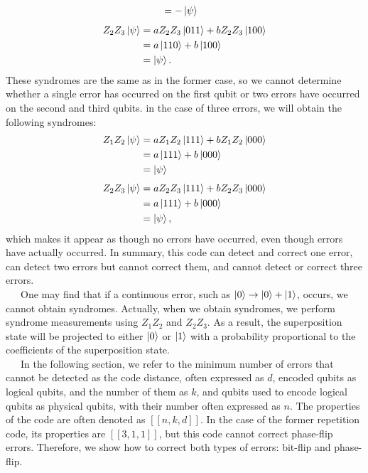 \documentclass[a4paper,11pt]{ltjsarticle}
\begin{document}
{{{\begin{align*}
                &= -\ket{\psi}
            \end{align*}
            \begin{align*}
                Z_2 Z_3\ket{\psi} &= aZ_2Z_3\ket{011}+bZ_2Z_3\ket{100}\\
                &= a\ket{110}+b\ket{100}\\
                &= \ket{\psi}.
            \end{align*}
            These syndromes are the same as in the former case, so we cannot determine whether a single error has occurred on the first qubit or two errors have occurred on the second and third qubits. in the case of three errors, we will obtain the following syndromes:
            \begin{align*}
                Z_1Z_2\ket{\psi} &= aZ_1Z_2\ket{111}+bZ_1Z_2\ket{000}\\
                &= a\ket{111}+b\ket{000}\\
                &= \ket{\psi}
            \end{align*}
            \begin{align*}
                Z_2 Z_3\ket{\psi} &= aZ_2Z_3\ket{111}+bZ_2Z_3\ket{000}\\
                &= a\ket{111}+b\ket{000}\\
                &= \ket{\psi},
            \end{align*}
            which makes it appear as though no errors have occurred, even though errors have actually occurred. In summary, this code can detect and correct one error, can detect two errors but cannot correct them, and cannot detect or correct three errors.\\
            \ \ \ One may find that if a continuous error, such as $\ket{0} \rightarrow \ket{0} + \ket{1}$, occurs, we cannot obtain syndromes. Actually, when we obtain syndromes, we perform syndrome measurements using $Z_1 Z_2$ and $Z_2 Z_3$. As a result, the superposition state will be projected to either $\ket{0}$ or $\ket{1}$ with a probability proportional to the coefficients of the superposition state.\\
            \ \ \ In the following section, we refer to the minimum number of errors that cannot be detected as the code distance, often expressed as $d$, encoded qubits as logical qubits, and the number of them as $k$, and qubits used to encode logical qubits as physical qubits, with their number often expressed as $n$. The properties of the code are often denoted as $[[n, k, d]]$. In the case of the former repetition code, its properties are $[[3, 1, 1]]$, but this code cannot correct phase-flip errors. Therefore, we show how to correct both types of errors: bit-flip and phase-flip.
        }

}}
\end{document}
